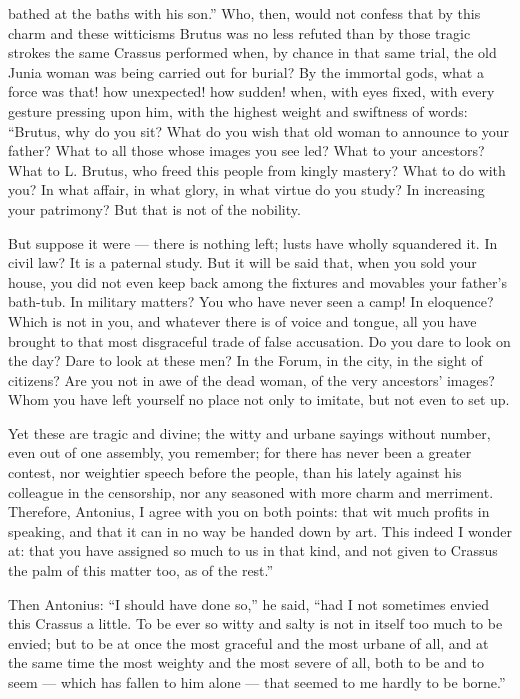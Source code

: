  bathed at the baths with his son.'' Who, then, would not confess that by this charm and these witticisms Brutus was no less refuted than by those tragic strokes the same Crassus performed when, by chance in that same trial, the old Junia woman was being carried out for burial? By the immortal gods, what a force was that! how unexpected! how sudden! when, with eyes fixed, with every gesture pressing upon him, with the highest weight and swiftness of words: ``Brutus, why do you sit? What do you wish that old woman to announce to your father? What to all those whose images you see led? What to your ancestors? What to L. Brutus, who freed this people from kingly mastery? What to do with you? In what affair, in what glory, in what virtue do you study? In increasing your patrimony? But that is not of the nobility.

 But suppose it were — there is nothing left; lusts have wholly squandered it. In civil law? It is a paternal study. But it will be said that, when you sold your house, you did not even keep back among the fixtures and movables your father's bath-tub. In military matters? You who have never seen a camp! In eloquence? Which is not in you, and whatever there is of voice and tongue, all you have brought to that most disgraceful trade of false accusation. Do you dare to look on the day? Dare to look at these men? In the Forum, in the city, in the sight of citizens? Are you not in awe of the dead woman, of the very ancestors' images? Whom you have left yourself no place not only to imitate, but not even to set up.

 Yet these are tragic and divine; the witty and urbane sayings without number, even out of one assembly, you remember; for there has never been a greater contest, nor weightier speech before the people, than his lately against his colleague in the censorship, nor any seasoned with more charm and merriment. Therefore, Antonius, I agree with you on both points: that wit much profits in speaking, and that it can in no way be handed down by art. This indeed I wonder at: that you have assigned so much to us in that kind, and not given to Crassus the palm of this matter too, as of the rest.''

 Then Antonius: ``I should have done so,'' he said, ``had I not sometimes envied this Crassus a little. To be ever so witty and salty is not in itself too much to be envied; but to be at once the most graceful and the most urbane of all, and at the same time the most weighty and the most severe of all, both to be and to seem — which has fallen to him alone — that seemed to me hardly to be borne.''


